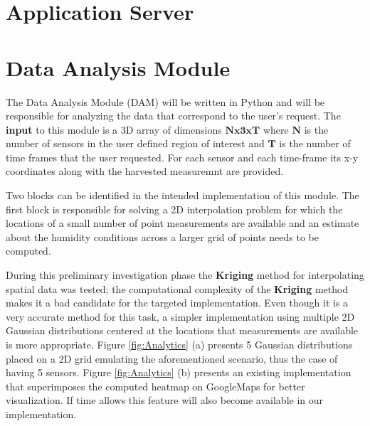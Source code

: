 \documentclass{article}
\begin{document}
\section{Application Server}

\section{Data Analysis Module}

The Data Analysis Module (DAM) will be written in Python and will be responsible for analyzing the data that correspond to the user's request. The \textbf{input} to this module is a 3D array of dimensions $\mathbf{Nx3xT}$ where $\mathbf{N}$ is the number of sensors in the user defined region of interest and $\mathbf{T}$ is the number of time frames that the user requested. For each sensor and each time-frame its x-y coordinates along with the harvested measuremnt are provided.

Two blocks can be identified in the intended implementation of this module. The first block is responsible for solving a 2D interpolation problem for which the locations of a small number of point measurements are available and an estimate about the humidity conditions across a larger grid of points needs to be computed. 

During this preliminary investigation phase the \textbf{Kriging} method for interpolating spatial data was tested; the computational complexity of the \textbf{Kriging} method makes it a bad candidate for the targeted implementation. Even though it is a very accurate method for this task, a simpler implementation using multiple 2D Gaussian distributions centered at the locations that measurements are available is more appropriate. Figure \ref{fig:Analytics} (a) presents 5 Gaussian distributions placed on a 2D grid emulating the  aforementioned scenario, thus the case of having 5 sensors. Figure \ref{fig:Analytics} (b) presents an existing implementation that superimposes the computed heatmap on GoogleMaps for better visualization. If time allows this feature will also become available in our implementation. 
\end{document}
